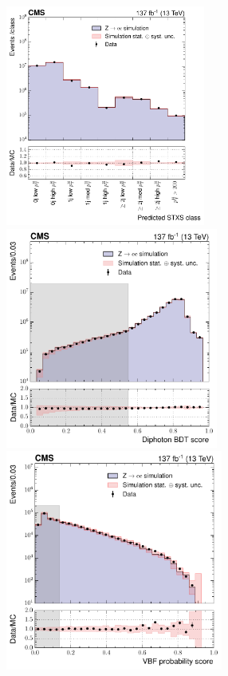 \begin{figure}[htbp]
  \centering
  \hfill
  \includegraphics[height=7.25cm]{Figures/hgg_overview/DYValidation_ggH_argmax_ratioPlot_logPlot.pdf}
  \hfill
  \includegraphics[height=7.25cm]{Figures/hgg_overview/DYValidation_DiphoBDT_ratioPlot_dipho_mva_logPlot.pdf}
  \includegraphics[height=7.25cm]{Figures/hgg_overview/DYValidation_VBFBDT_ratioPlot_vbfMvaResult_prob_VBF_logPlot.pdf}

\end{figure}
